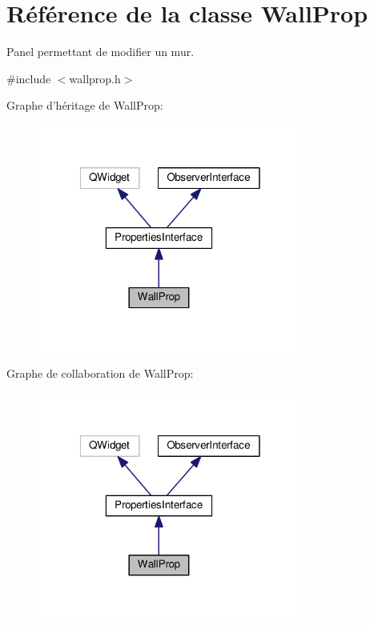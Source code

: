 \hypertarget{classWallProp}{\section{Référence de la classe Wall\+Prop}
\label{classWallProp}
}


Panel permettant de modifier un mur.  




{\ttfamily \#include $<$wallprop.\+h$>$}



Graphe d'héritage de Wall\+Prop\+:\nopagebreak
\begin{figure}[H]
\begin{center}
\leavevmode
\includegraphics[width=247pt]{dd/d41/classWallProp__inherit__graph}
\end{center}
\end{figure}


Graphe de collaboration de Wall\+Prop\+:\nopagebreak
\begin{figure}[H]
\begin{center}
\leavevmode
\includegraphics[width=247pt]{da/dd5/classWallProp__coll__graph}
\end{center}
\end{figure}
